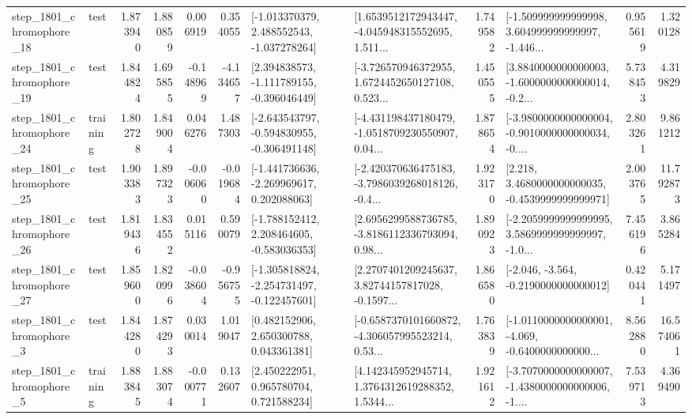 \begin{tabular}{llrrrrllrlrr}
 step\_1801\_chromophore\_18 &      test &      1.873940 &    1.880859 &      0.006919 &  0.354055 &   [-1.013370379, 2.488552543, -1.037278264] &  [1.6539512172943447, -4.045948315552695, 1.511... &       1.749582 &  [-1.509999999999998, 3.604999999999997, -1.446... &            0.955619 &          1.320128 \\
 step\_1801\_chromophore\_19 &      test &      1.844824 &    1.695855 &     -0.148969 & -4.134657 &   [2.394838573, -1.111789155, -0.396046449] &  [-3.726570946372955, 1.6724452650127108, 0.523... &       1.450555 &  [3.8840000000000003, -1.6000000000000014, -0.2... &            5.738453 &          4.319829 \\
 step\_1801\_chromophore\_24 &  training &      1.802728 &    1.849004 &      0.046276 &  1.487303 &  [-2.643543797, -0.594830955, -0.306491148] &  [-4.431198437180479, -1.0518709230550907, 0.04... &       1.878654 &  [-3.9800000000000004, -0.9010000000000034, -0.... &            2.803261 &          9.861212 \\
 step\_1801\_chromophore\_25 &      test &      1.903383 &    1.897323 &     -0.006060 & -0.019684 &   [-1.441736636, -2.269969617, 0.202088063] &  [-2.420370636475183, -3.7986039268018126, -0.4... &       1.923170 &   [2.218, 3.4680000000000035, -0.4539999999999971] &            2.003765 &         11.792873 \\
 step\_1801\_chromophore\_26 &      test &      1.819436 &    1.834552 &      0.015116 &  0.590079 &   [-1.788152412, 2.208464605, -0.583036353] &  [2.6956299588736785, -3.8186112336793094, 0.98... &       1.890923 &  [-2.2059999999999995, 3.5869999999999997, -1.0... &            7.456196 &          3.865284 \\
 step\_1801\_chromophore\_27 &      test &      1.859600 &    1.820996 &     -0.038604 & -0.956755 &  [-1.305818824, -2.254731497, -0.122457601] &  [2.2707401209245637, 3.82744157817028, -0.1597... &       1.866580 &              [-2.046, -3.564, -0.2190000000000012] &            0.420441 &          5.171497 \\
  step\_1801\_chromophore\_3 &      test &      1.844280 &    1.874293 &      0.030014 &  1.019047 &     [0.482152906, 2.650300788, 0.043361381] &  [-0.6587370101660872, -4.306057995523214, 0.53... &       1.763839 &  [-1.0110000000000001, -4.069, -0.6400000000000... &            8.562880 &         16.574061 \\
  step\_1801\_chromophore\_5 &  training &      1.883845 &    1.883074 &     -0.000771 &  0.132607 &     [2.450222951, 0.965780704, 0.721588234] &  [4.142345952945714, 1.3764312619288352, 1.5344... &       1.921612 &  [-3.7070000000000007, -1.4380000000000006, -1.... &            7.539713 &          4.369490 \\

\end{tabular}
